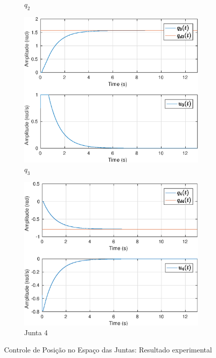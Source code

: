 \begin{figure}[H]
\begin{subfigure}{.5\textwidth}
  \caption{$q_2$}
  \label{fig:sub2}
\end{subfigure}
\begin{subfigure}{.5\textwidth}
  \centering
  \includegraphics[width=\linewidth]{./img/joint_test1/q3.eps}
  \caption{ $q_3$}
  \label{fig:sub1}
\end{subfigure}%
\begin{subfigure}{.5\textwidth}
  \centering
  \includegraphics[width=\linewidth]{./img/joint_test1/q4.eps}
  \caption{Junta 4}
  \label{fig:sub2}
\end{subfigure}
\caption{Controle de Posição no Espaço das Juntas: Resultado experimental}
\label{fig:test}
\end{figure}


